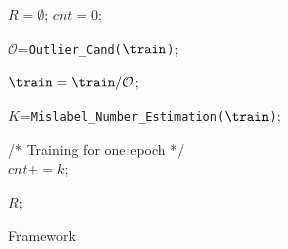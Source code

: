 
 \begin{figure}[!t]
	\begin{algorithm}[H]
		\normalem
	\caption{ \sys Framework \label{alg:framework}}
		{\small
	
	$R = \emptyset$; $cnt=0$;
	
	$\mathcal{O}$=\texttt{Outlier\_Cand($\train$)}; \\
	
	$\train = \train / \mathcal{O}$;
	
	$K$=\texttt{Mislabel\_Number\_Estimation($\train$)}; \\
		
	{
		/* Training for one epoch */ \\
      $cnt += k$;
      
    }
		
		
			
		\Return $R$;\\
	
	}
	\end{algorithm}
	\vspace{-2em}
\end{figure}